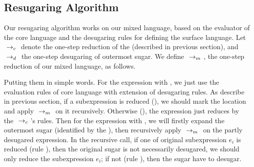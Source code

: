 \subsection{Resugaring Algorithm}

Our resugaring algorithm works on our mixed language, based on the evaluator of the core language and the desugaring rules for defining the surface language. Let $~\rightarrow_c~$ denote the one-step reduction of the  (described in previous section), and $~\rightarrow_d~$ the one-step desugaring of outermost sugar. We define $~\rightarrow_m~$, the one-step reduction of our mixed language, as follows.
\label{mark:mixedreduction}
{}
{}
{}
{
}

Putting them in simple words. For the expression with , we just use the evaluation rules of core language with extension of desugaring rules. As describe in previous section, if a  subexpression is reduced (), we should mark the location and apply $~\rightarrow_m~$ on it recursively. Otherwise (), the expression just reduces by the $~\rightarrow_c~$'s rules.
Then for the expression with , we will firstly expand the outermost sugar (identified by the ), then recursively apply $~\rightarrow_m~$ on the partly desugared expression. In the recursive call, if one of original subexpression $e_i$ is reduced (rule ), then the original sugar is not necessarily desugared, we should only reduce the subexpression $e_i$; if not (rule ), then the sugar have to desugar.


